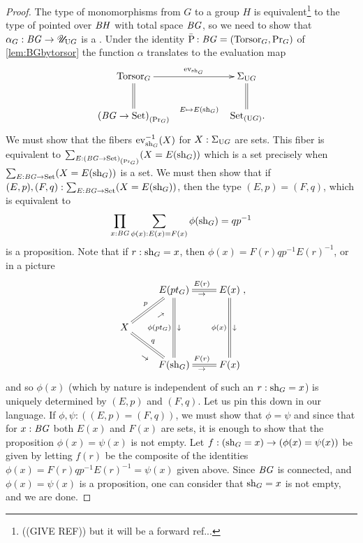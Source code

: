 \begin{proof}
  The type of monomorphisms from $G$ to a group $H$ is
  equivalent\footnote{((GIVE REF)) but it will be a forward ref...} to
  the type of pointed \coverings over $\mathit{B}\mathit{H}$ with total space $\mathit{B}\mathit{G}$, so
  we need to show that $\alpha_G:\mathit{B}\mathit{G}\to{\mathscr{U}}_{\mathrm{U} G}$ is a
  \covering.  Under the identity
  $\bar{\mathrm{P}_{\!}}:\mathit{B}\mathit{G}=(\mathrm{Torsor}_G,\mathrm{Pr}_{{G}})$ of
  \cref{lem:BGbytorsor} the function $\alpha$ translates to the
  evaluation map
  $$\xymatrix{
    \typetorsor_G\ar[rr]^-{\mathrm{ev}_{\sh_G}}\ar@{=}[d]&&\Sigma_{\USym G}\ar@{=}[d]\\
    \conncomp{(\BG\to\Set)}{\princ G}\ar@{}[rr]^-{E\mapsto E(\sh_G)}&&
    \,\conncomp{\Set}{\USym G}.  }$$ We must show that the fibers
  $\inv{\ev_{\sh_G}}(X)$ for $X:\Sigma_{\mathrm{U} G}$ are sets.  This
  fiber is equivalent to
  $\sum_{E:{{(\mathit{B}\mathit{G}\to\mathrm{Set})}_{\left(\mathrm{Pr}_{{G}}\right)}}}(X=E(\mathrm{sh}_G))$ which is a
  set precisely when $\sum_{E:\mathit{B}\mathit{G}\to\mathrm{Set}}(X=E(\mathrm{sh}_G))$ is a set.  We
  must then show that if $(E,p),(F,q):\sum_{E:\mathit{B}\mathit{G}\to\mathrm{Set}}(X=E(\mathrm{sh}_G))$,
  then the type $(E,p)=(F,q)$, which is equivalent
  to
  $$\prod_{x:\mathit{B}\mathit{G}}\sum_{\phi(x):E(x)=F(x)}\phi(\mathrm{sh}_G)=qp^{-1}$$
  is a proposition.  Note that if $r:\mathrm{sh}_G=x$, then
  $\phi(x)=F(r)qp^{-1}E(r)^{-1}$, or in a picture
  \begin{displaymath}
    \xymatrix{&E(pt_G)\ar@{=}[r]^{E(r)}_\to\ar@{=}[dd]_{\phi(pt_G)}^\downarrow&E(x)\ar@{=}[dd]_{\phi(x)}^\downarrow\\
      X\ar@{=}[ur]^p_{\rotatebox{35}{\footnotesize$\to$}}\ar@{=}[dr]^q_{\rotatebox{-35}{\footnotesize$\to$}}&&\\
      &F(\sh_G)\ar@{=}[r]^{F(r)}_\to&F(x)},
  \end{displaymath}
  and so $\phi(x)$ (which by nature is independent of such an
  $r:\mathrm{sh}_G=x$) is uniquely determined by $(E,p)$ and $(F,q)$.  Let us
  pin this down in our language.  If $\phi,\psi:((E,p)=(F,q))$, we
  must show that $\phi=\psi$ and since that for $x:\mathit{B}\mathit{G}$ both $E(x)$ and
  $F(x)$ are sets, it is enough to show that the proposition
  $\phi(x)=\psi(x)$ is not empty.  Let
  $f:(\mathrm{sh}_G=x)\to(\phi(x)=\psi(x))$ be given by letting $f(r)$ be the
  composite of the identities $\phi(x)=F(r)qp^{-1}E(r)^{-1}=\psi(x)$
  given above.  Since $\mathit{B}\mathit{G}$ is connected, and $\phi(x)=\psi(x)$ is a
  proposition, one can consider that $\mathrm{sh}_G=x$ is not empty, and we
  are done.
\end{proof}


